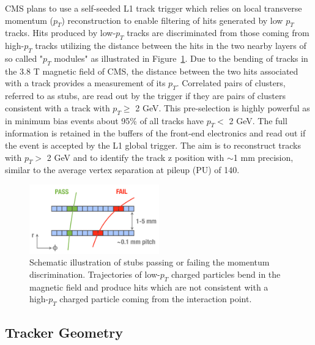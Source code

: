 \documentclass{PoS}
\begin{document}
CMS plans to use a self-seeded L1 track trigger which relies on local transverse momentum ($p_T$) reconstruction to enable filtering of hits generated by low $p_T$ tracks. Hits produced by low-$p_T$ tracks are discriminated from those coming from high-$p_T$ tracks utilizing the distance between the hits in the two nearby layers of so called "$p_T$ modules" as illustrated in Figure~\ref{fig:PtModule}. Due to the bending of tracks in the 3.8 T magnetic field of CMS, the distance between the two hits associated with a track provides a measurement of its $p_T$. Correlated pairs of clusters, referred to as stubs, are read out by the trigger if they are pairs of clusters consistent with a track with $p_T \geq$ 2 GeV. This pre-selection is highly powerful as in minimum bias events about 95\% of all tracks have $p_T < $ 2 GeV. The full information is retained in the buffers of the front-end electronics and read out if the event is accepted by the L1 global trigger. The aim is to reconstruct tracks with $p_T >$ 2 GeV and to identify the track z position with $\sim$1 mm precision, similar to the average vertex separation at pileup (PU) of 140.
\begin{figure}[h!]
  \centering
	\includegraphics[width=0.5\textwidth]{Figures/PtModule.png}
	\caption{Schematic illustration of stubs passing or failing the momentum discrimination. Trajectories of low-$p_T$ charged particles bend in the magnetic field and produce hits which are not consistent with a high-$p_T$ charged particle coming from the interaction point.}
	\label{fig:PtModule}
\end{figure}

\subsection{Tracker Geometry}
\end{document}
